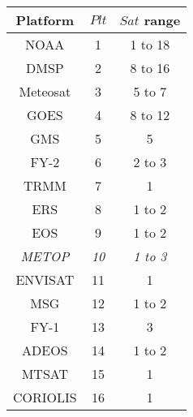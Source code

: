 \begin{center}\begin{tabular}{|c|c|c|}
\hline
Platform & $Plt$ & $Sat$ range \\
\hline
NOAA & 1 & 1 to 18 \\
DMSP &  2  & 8 to 16 \\
Meteosat &  3  & 5 to 7 \\
GOES &  4  & 8 to 12 \\
GMS &  5  & 5 \\
FY-2 &  6  & 2 to 3 \\
TRMM &  7  & 1 \\
ERS &  8  & 1 to 2 \\
EOS &  9  & 1 to 2 \\
\it METOP &  \it 10  & \it 1 to 3 \\
ENVISAT  & 11  & 1 \\
MSG  & 12  & 1 to 2 \\
FY-1  & 13  & 3 \\
ADEOS  & 14  & 1 to 2 \\
MTSAT  & 15  & 1 \\
CORIOLIS  & 16 &  1 \\  
\hline
\end{tabular}
\end{center}

